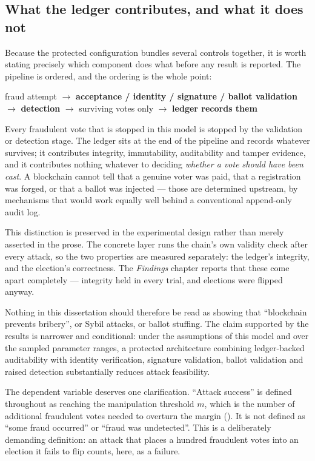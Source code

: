 \subsection{What the ledger contributes, and what it does not}
\label{sec:method-attribution}

Because the protected configuration bundles several controls together,
it is worth stating precisely which component does what before any
result is reported. The pipeline is ordered, and the ordering is the
whole point:

\begin{center}
\small
fraud attempt $\rightarrow$ \textbf{acceptance / identity / signature /
ballot validation} $\rightarrow$ \textbf{detection} $\rightarrow$
surviving votes only $\rightarrow$ \textbf{ledger records them}
\end{center}

Every fraudulent vote that is stopped in this model is stopped by the
validation or detection stage. The ledger sits at the end of the
pipeline and records whatever survives; it contributes integrity,
immutability, auditability and tamper evidence, and it contributes
nothing whatever to deciding \emph{whether a vote should have been
cast}. A blockchain cannot tell that a genuine voter was paid, that a
registration was forged, or that a ballot was injected --- those are
determined upstream, by mechanisms that would work equally well behind
a conventional append-only audit log.

This distinction is preserved in the experimental design rather than
merely asserted in the prose. The concrete layer runs the chain's own
validity check after every attack, so the two properties are measured
separately: the ledger's integrity, and the election's correctness. The
\emph{Findings} chapter reports that these come apart completely ---
integrity held in every trial, and elections were flipped anyway.

Nothing in this dissertation should therefore be read as showing that
``blockchain prevents bribery'', or Sybil attacks, or ballot stuffing.
The claim supported by the results is narrower and conditional: under
the assumptions of this model and over the sampled parameter ranges, a
protected architecture combining ledger-backed auditability with
identity verification, signature validation, ballot validation and
raised detection substantially reduces attack feasibility.

The dependent variable deserves one clarification. ``Attack success''
is defined throughout as reaching the manipulation threshold $m$, which
is the number of additional fraudulent votes needed to overturn the
margin (). It is not defined as ``some fraud
occurred'' or ``fraud was undetected''. This is a deliberately
demanding definition: an attack that places a hundred fraudulent votes
into an election it fails to flip counts, here, as a failure.

